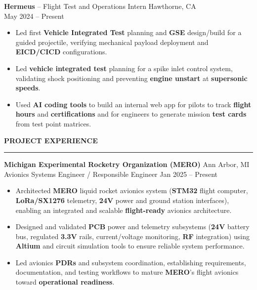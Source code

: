 \documentclass[10pt]{article}
\newcommand{\ressection}[1]{
  \vspace{0.12em}
  {\large\bfseries #1}\par
  \vspace{0.05em}\hrule\vspace{0.12em}
}
\begin{document}
{\bfseries Hermeus} -- Flight Test and Operations Intern \hfill Hawthorne, CA \\
May 2024 -- Present
\begin{itemize}
\item Led first \textbf{Vehicle Integrated Test} planning and \textbf{GSE} design/build for a guided projectile, verifying mechanical payload deployment and \textbf{EICD/CICD} configurations.
\item Led \textbf{vehicle integrated test} planning for a spike inlet control system, validating shock positioning and preventing \textbf{engine unstart} at \textbf{supersonic speeds}.
\item Used \textbf{AI coding tools} to build an internal web app for pilots to track \textbf{flight hours} and \textbf{certifications} and for engineers to generate mission \textbf{test cards} from test point matrices.
\end{itemize}

\ressection{PROJECT EXPERIENCE}

{\bfseries Michigan Experimental Rocketry Organization (MERO)} \hfill Ann Arbor, MI \\
Avionics Systems Engineer / Responsible Engineer \hfill Jan 2025 -- Present
\begin{itemize}
\item Architected \textbf{MERO} liquid rocket avionics system (\textbf{STM32} flight computer, \textbf{LoRa/SX1276} telemetry, \textbf{24V} power and ground station interfaces), enabling an integrated and scalable \textbf{flight-ready} avionics architecture.
\item Designed and validated \textbf{PCB} power and telemetry subsystems (\textbf{24V} battery bus, regulated \textbf{3.3V} rails, current/voltage monitoring, \textbf{RF} integration) using \textbf{Altium} and circuit simulation tools to ensure reliable system performance.
\item Led avionics \textbf{PDRs} and subsystem coordination, establishing requirements, documentation, and testing workflows to mature \textbf{MERO}'s flight avionics toward \textbf{operational readiness}.
\end{itemize}
\end{document}
